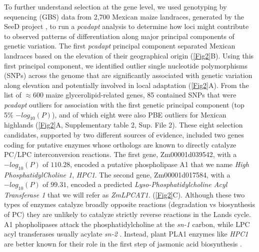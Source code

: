 \documentclass[9pt,twocolumn,twoside,lineno]{biorxiv}
\newcommand{\hpc}{\textit{HPC1}\xspace}
\begin{document}
To further understand selection at the gene level, we used genotyping by sequencing (GBS) data from 2,700 Mexican maize landraces, generated by the SeeD project \cite{Romero_Navarro2017-cn, Gates2019-xu}, to run a \textit{pcadapt} \cite{Luu2017-ws} analysis to determine how loci might contribute to observed patterns of differentiation along major principal components of genetic variation. 
The first \textit{pcadapt} principal component separated Mexican landraces based on the elevation of their geographical origin (\cref{Fig2}B).
Using this first principal component, we identified outlier single nucleotide polymorphisms (SNPs) across the genome that are significantly associated with genetic variation along elevation and potentially involved in local adaptation (\cref{Fig2}A).
From the list of $\approx 600$ maize glycerolipid-related genes, 85 contained SNPs that were \textit{pcadapt} outliers for association with the first genetic principal component (top 5\% $-log_{10}(P)$), and of which eight were also PBE outliers for Mexican highlands (\cref{Fig2}A, Supplementary table 2, Sup. File 2). 
These eight selection candidates, supported by two different sources of evidence, included two genes coding for putative enzymes whose orthologs are known to directly catalyze PC/LPC interconversion reactions. 
The first gene, Zm00001d039542, with a $-log_{10}(P)$ of $110.28$, encoded a putative phospholipase A1 that we name \textit{High PhosphatidylCholine 1}, \hpc.
The second gene, Zm00001d017584, with a $-log_{10}(P)$ of $99.31$, encoded a predicted \textit{Lyso-Phosphatidylcholine Acyl Transferase 1} that we will refer as \textit{ZmLPCAT1}. (\cref{Fig2}C). 
Although these two types of enzymes catalyze broadly opposite reactions (degradation vs biosynthesis of PC) they are unlikely to catalyze strictly reverse reactions in the Lands cycle. 
A1 phopholipases attack the phosphatidylcholine at the \textit{sn-1} carbon, while LPC acyl transferases usually acylate \textit{sn-2} \cite{wang2012,richmond2011}.
Instead, plant PLA1 enzymes like \hpc are better known for their role in the first step of jasmonic acid biosynthesis \cite{wang2018b, Ishiguro2001-ob}.
\end{document}
